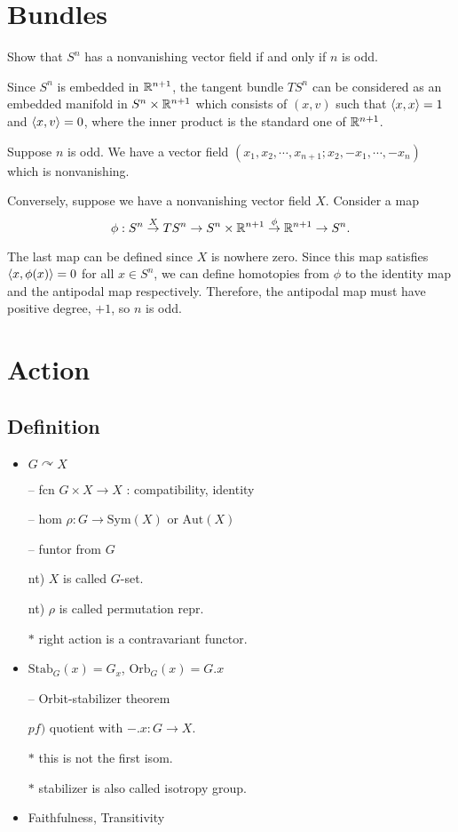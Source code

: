 \documentclass[11pt]{article}
\let\realsection\section
\renewcommand\section{\newpage\realsection}
\begin{document}
\section{Bundles}
Show that $S^n$ has a nonvanishing vector field if and only if $n$ is odd.
\begin{sol}
Since $S^n$ is embedded in $\mathbb{R}^{n+1}$, the tangent bundle $TS^n$ can be considered as an embedded manifold in $S^n\times\mathbb{R}^{n+1}$ which consists of $(x,v)$ such that $\langle x,x\rangle=1$ and $\langle x,v\rangle=0$, where the inner product is the standard one of $\mathbb{R}^{n+1}$.

Suppose $n$ is odd.
We have a vector field
$(x_1,x_2,\cdots,x_{n+1};x_2,-x_1,\cdots,-x_n)$
which is nonvanishing.

Conversely, suppose we have a nonvanishing vector field $X$.
Consider a map
\[\phi:S^n\to{X}TS^n\to S^n\x\R^{n+1}\to{\phi}\R^{n+1}\to S^n.\]

The last map can be defined since $X$ is nowhere zero. Since this map satisfies $\langle x,\phi(x)\rangle=0$ for all $x\in S^n$, we can define homotopies from $\phi$ to the identity map and the antipodal map respectively. Therefore, the antipodal map must have positive degree, $+1$, so $n$ is odd.
\end{sol}

\section{Action}

\subsection*{Definition}
\begin{itemize}
\item $G\curvearrowright X$
	\par-- fcn $G\times X\to X$ : compatibility, identity
	\par-- hom $\rho\colon G\to\text{Sym}(X)$ or $\text{Aut}(X)$
	\par-- funtor from $G$
	\par nt) $X$ is called $G$-set.
	\par nt) $\rho$ is called permutation repr.
	\par$*$ right action is a contravariant functor.
\item $\text{Stab}_G(x)=G_x$, $\text{Orb}_G(x)=G.x$
	\par-- Orbit-stabilizer theorem
		\par\quad$pf)$ quotient with $-.x\colon G\to X$.
		\par\quad$*$ this is not the first isom.
	\par$*$ stabilizer is also called isotropy group.
\item Faithfulness, Transitivity
\end{itemize}
\end{document}
